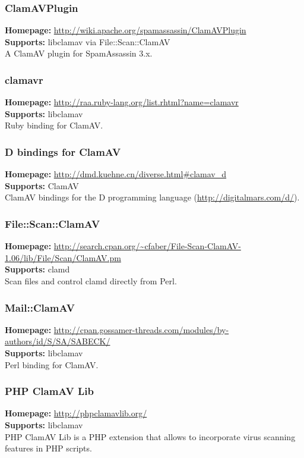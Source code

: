 \documentclass[a4paper,titlepage,12pt]{article}
\begin{document}
    \subsubsection{ClamAVPlugin}
    \textbf{Homepage:} \url{http://wiki.apache.org/spamassassin/ClamAVPlugin}\\
    \textbf{Supports:} libclamav via File::Scan::ClamAV\\[4pt]
    A ClamAV plugin for SpamAssassin 3.x.

    \subsubsection{clamavr}
    \textbf{Homepage:} \url{http://raa.ruby-lang.org/list.rhtml?name=clamavr}\\
    \textbf{Supports:} libclamav\\[4pt]
    Ruby binding for ClamAV.

    \subsubsection{D bindings for ClamAV}
    \textbf{Homepage:} \url{http://dmd.kuehne.cn/diverse.html#clamav_d}\\
    \textbf{Supports:} ClamAV\\[4pt]
    ClamAV bindings for the D programming language
    (\url{http://digitalmars.com/d/}).

    \subsubsection{File::Scan::ClamAV}
    \textbf{Homepage:} \url{http://search.cpan.org/~cfaber/File-Scan-ClamAV-1.06/lib/File/Scan/ClamAV.pm}\\
    \textbf{Supports:} clamd\\[4pt]
     Scan files and control clamd directly from Perl.

    \subsubsection{Mail::ClamAV}
    \textbf{Homepage:} \url{http://cpan.gossamer-threads.com/modules/by-authors/id/S/SA/SABECK/}\\
    \textbf{Supports:} libclamav\\[4pt]
    Perl binding for ClamAV.

    \subsubsection{PHP ClamAV Lib}
    \textbf{Homepage:} \url{http://phpclamavlib.org/}\\
    \textbf{Supports:} libclamav\\[4pt]
    PHP ClamAV Lib is a PHP extension that allows to incorporate virus
    scanning features in PHP scripts.
\end{document}
